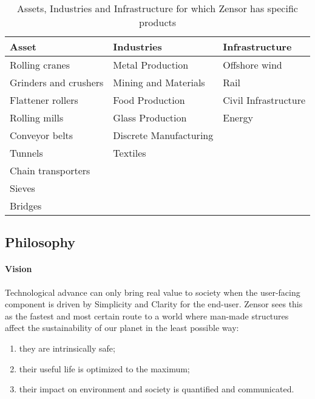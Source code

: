 \begin{table}[ht]
    \caption{Assets, Industries and Infrastructure for which Zensor has specific products}
    \begin{tabular}{@{}lll@{}}
    \toprule
    Asset                 & Industries                       & Infrastructure                       \\ \midrule
    Rolling cranes        & Metal Production                 & Offshore wind                        \\
    Grinders and crushers & Mining and Materials             & Rail                                 \\
    Flattener rollers     & Food Production                  & Civil Infrastructure                 \\
    Rolling mills         & Glass Production                 & Energy                               \\
    Conveyor belts        & Discrete Manufacturing                                                  \\
    Tunnels               & Textiles                                                                \\
    Chain transporters    &                                                                         \\
    Sieves                &                                                                         \\
    Bridges               &                                                                         \\ \bottomrule
\end{tabular}
\end{table}
\subsection{Philosophy}
\paragraph{Vision} 
Technological advance can only bring real value to society when the user-facing component is driven by Simplicity and Clarity for the end-user. 
Zensor sees this as the fastest and most certain route to a world where man-made structures affect the sustainability of our planet in the least possible way:
\begin{enumerate}
    \item they are intrinsically safe;
    \item their useful life is optimized to the maximum;
    \item their impact on environment and society is quantified and communicated.
\end{enumerate}


